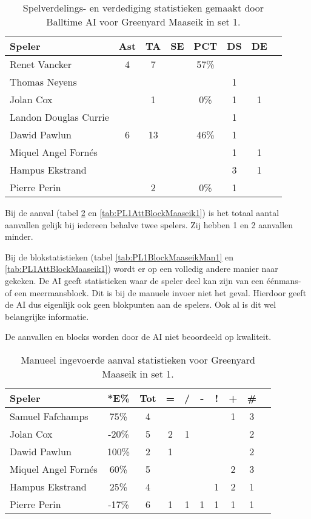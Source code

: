 \begin{table}[ht!]
  \centering
  \scriptsize
  \begin{tabular}{|l|c|c|c|c|c|c|c|}  \hline
    \textbf{Speler} & Ast & TA & SE & PCT & DS & DE \\ \hline
    Renet Vancker & 4 & 7 &  & 57\% &  &  \\
    Thomas Neyens &  &  &  &  & 1 &  \\
    Jolan Cox &  & 1 &  & 0\% & 1 & 1 \\
    Landon Douglas Currie &  &   &  &  & 1 &  \\
    Dawid Pawlun & 6 & 13 &  & 46\% & 1 &  \\
    Miquel Angel Fornés &  &  &  &  & 1 & 1 \\
    Hampus Ekstrand &  &  &  &  & 3 & 1 \\
    Pierre Perin &  & 2 &  & 0\% & 1 &  \\ \hline
  \end{tabular}
  \caption[Spelverdelings- en verdedigingsstatistieken gemaakt door Balltime AI voor Greenyard Maaseik in set 1]{\label{tab:PL1SetDigMaaseikAI1}Spelverdelings- en verdediging statistieken gemaakt door Balltime AI voor Greenyard Maaseik in set 1.}
\end{table}

Bij de aanval (tabel \ref{tab:PL1AttMaaseikMan1} en \ref{tab:PL1AttBlockMaaseik1}) is het totaal aantal aanvallen gelijk bij iedereen behalve twee spelers. Zij hebben 1 en 2 aanvallen minder.

Bij de blokstatistieken (tabel \ref{tab:PL1BlockMaaseikMan1} en \ref{tab:PL1AttBlockMaaseik1}) wordt er op een volledig andere manier naar gekeken. De AI geeft statistieken waar de speler deel kan zijn van een éénmans- of een meermansblock. Dit is bij de manuele invoer niet het geval. Hierdoor geeft de AI dus eigenlijk ook geen blokpunten aan de spelers. Ook al is dit wel belangrijke informatie.

De aanvallen en blocks worden door de AI niet beoordeeld op kwaliteit.

\begin{table}[ht!]
    \centering
    \scriptsize
    \begin{tabular}{|l|c|c|c|c|c|c|c|c|c|} \hline
        \textbf{Speler} & *E\% & Tot & = & / & - & ! & + & \# \\ \hline
        Samuel Fafchamps & 75\% & 4 &  &  &  &  & 1 & 3 \\ 
        Jolan Cox & -20\% & 5 & 2 & 1 &  &  &  & 2 \\ 
        Dawid Pawlun  & 100\% & 2 & 1 &  &  &  &  & 2 \\ 
        Miquel Angel Fornés & 60\% & 5 &  &  &  &  & 2 & 3 \\
        Hampus Ekstrand & 25\% & 4 &  &  &  & 1 & 2 & 1 \\ 
        Pierre Perin & -17\% & 6 & 1 & 1 & 1 & 1 & 1 & 1 \\ \hline
    \end{tabular}
    \caption[Manueel ingevoerde aanvalsstatistieken voor Greenyard Maaseik in set 1]{\label{tab:PL1AttMaaseikMan1}Manueel ingevoerde aanval statistieken voor Greenyard Maaseik in set 1.}
\end{table}

